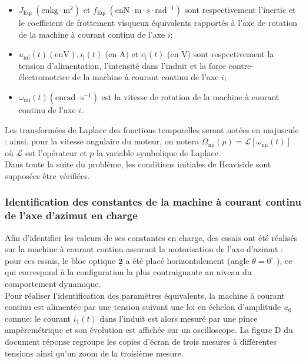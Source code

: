 \begin{itemize}
  \item $J_{\text {Eqi }}\left(\mathrm{en} \mathrm{kg} \cdot \mathrm{m}^{2}\right)$ et $f_{\text {Eqi }}\left(\mathrm{en} \mathrm{N} \cdot \mathrm{m} \cdot \mathrm{s} \cdot \mathrm{rad}^{-1}\right)$ sont respectivement l'inertie et le coefficient de frottement visqueux équivalents rapportés à l'axe de rotation de la machine à courant continu de l'axe $i$;
  \item $u_{\mathrm{mi}}(t)(\mathrm{en} \mathrm{V}), i_{\mathrm{i}}(t)$ (en A$)$ et $e_{\mathrm{i}}(t)$ (en V$)$ sont respectivement la tension d'alimentation, l'intensité dans l'induit et la force contre-électromotrice de la machine à courant continu de l'axe $i$;
  \item $\omega_{\mathrm{mi}}(t)\left(\mathrm{en} \mathrm{rad} \cdot \mathrm{s}^{-1}\right)$ est la vitesse de rotation de la machine à courant continu de l'axe $i$.
\end{itemize}

Les transformées de Laplace des fonctions temporelles seront notées en majuscule : ainsi, pour la vitesse angulaire du moteur, on notera $\Omega_{\mathrm{mi}}(p)=\mathcal{L}\left[\omega_{\mathrm{mi}}(t)\right]$ où $\mathcal{L}$ est l'opérateur et $p$ la variable symbolique de Laplace.\\
Dans toute la suite du problème, les conditions initiales de Heaviside sont supposées être vérifiées.\\
\fi
\ifprof
\begin{corrige}
\end{corrige}
\else
\fi


\subsubsection{Identification des constantes de la machine à courant continu de l'axe d'azimut en charge}
\ifprof
\else
Afin d'identifier les valeurs de ses constantes en charge, des essais ont été réalisés sur la machine à courant continu assurant la motorisation de l'axe d'azimut : pour ces essais, le bloc optique $\underline{\mathbf{2}}$ a été placé horizontalement (angle $\theta=0^{\circ}$ ), ce qui correspond à la configuration la plus contraignante au niveau du comportement dynamique.\\
Pour réaliser l'identification des paramètres équivalents, la machine à courant continu est alimentée par une tension suivant une loi en échelon d'amplitude $u_{0}$ connue: le courant $i_{1}(t)$ dans l'induit est alors mesuré par une pince ampèremétrique et son évolution est affichée sur un oscilloscope. La figure D du document réponse regroupe les copies d'écran de trois mesures à différentes tensions ainsi qu'un zoom de la troisième mesure.\\
\fi

